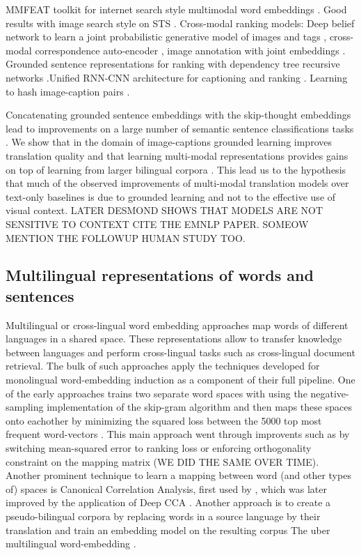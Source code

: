  MMFEAT toolkit for internet search style multimodal word embeddings \cite{kiela2016mmfeat}. Good results with image search style on STS \cite{glavavs2017if}.
Cross-modal ranking models: Deep belief network to learn a joint probabilistic generative model of images and tags \cite{srivastava2012learning}, cross-modal correspondence auto-encoder \cite{feng2014cross}, image annotation with joint embeddings \cite{weston2010large}. Grounded sentence representations for ranking with dependency tree recursive networks \cite{socher2014grounded}.Unified RNN-CNN architecture for captioning and ranking \cite{kiros2014multimodal}. Learning to hash image-caption pairs \cite{jiang2016deep,cao2016deep}.

Concatenating grounded sentence embeddings with the skip-thought embeddings lead to improvements on a large number of semantic sentence classifications tasks \cite{kiela2017learning}. We show that in the domain of image-captions
grounded learning improves translation quality and that learning multi-modal representations provides gains on top of learning from larger bilingual corpora \cite{elliott2017imagination}.  This lead us to the hypothesis that much of the observed improvements of multi-modal translation models over text-only baselines is due to grounded learning and not to the effective use of visual context. LATER DESMOND SHOWS THAT MODELS ARE NOT SENSITIVE TO CONTEXT CITE THE EMNLP PAPER. SOMEOW MENTION THE FOLLOWUP HUMAN STUDY TOO.

\subsection{Multilingual representations of words and sentences}
Multilingual or cross-lingual word embedding approaches map words of different languages in a shared space. These representations allow to transfer knowledge between languages and
perform cross-lingual tasks such as cross-lingual document retrieval. The bulk of such approaches apply the techniques developed for monolingual word-embedding induction as a component
of their full pipeline. One of the early approaches trains two separate word spaces with using the negative-sampling implementation of the skip-gram algorithm and then maps these spaces onto eachother by minimizing the squared loss between the 5000 top most frequent word-vectors \cite{mikolov2013exploiting}. This main approach went through improvents
such as by switching mean-squared error to ranking loss \cite{lazaridou2015hubness} or enforcing orthogonality constraint on the mapping matrix
\cite{xing2015normalized}   (WE DID THE SAME OVER TIME). Another prominent technique to learn a mapping between word (and other types of) spaces is Canonical Correlation Analysis, first
used by \cite{faruqui2014improving}, which was later improved by the application of Deep CCA \cite{lu2015deep}. Another approach is to create a pseudo-bilingual corpora by replacing words
in a source language by their translation and train an embedding model on the resulting corpus
The uber multilingual word-embedding \cite{ammar2016massively}.

